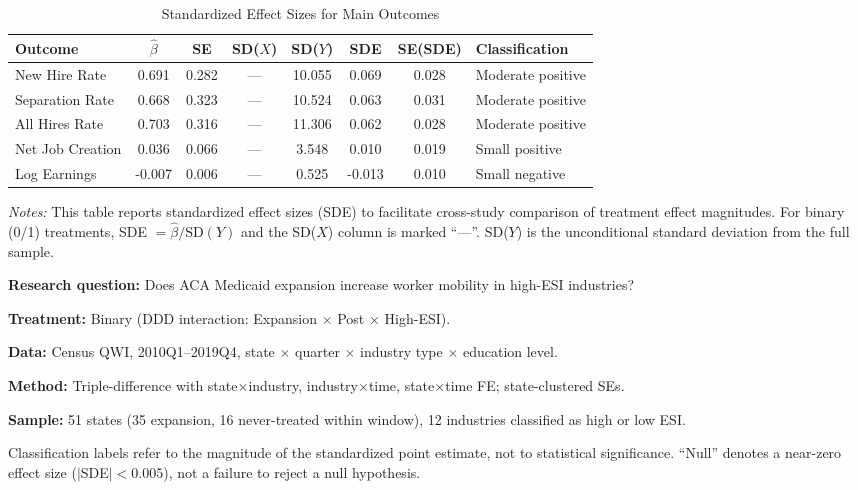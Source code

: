 \begin{table}[H]
\centering
\caption{Standardized Effect Sizes for Main Outcomes}
\label{tab:sde}
\begin{adjustbox}{max width=\textwidth}
\begin{tabular}{lccccccl}
\toprule
Outcome & $\hat{\beta}$ & SE & SD($X$) & SD($Y$) & SDE & SE(SDE) & Classification \\
\midrule
New Hire Rate & 0.691 & 0.282 & --- & 10.055 & 0.069 & 0.028 & Moderate positive \\
Separation Rate & 0.668 & 0.323 & --- & 10.524 & 0.063 & 0.031 & Moderate positive \\
All Hires Rate & 0.703 & 0.316 & --- & 11.306 & 0.062 & 0.028 & Moderate positive \\
Net Job Creation & 0.036 & 0.066 & --- & 3.548 & 0.010 & 0.019 & Small positive \\
Log Earnings & -0.007 & 0.006 & --- & 0.525 & -0.013 & 0.010 & Small negative \\
\bottomrule
\end{tabular}
\end{adjustbox}
\par\vspace{0.3em}
{\footnotesize \emph{Notes:} This table reports standardized effect sizes (SDE) to facilitate cross-study comparison of treatment effect magnitudes. For binary (0/1) treatments, SDE $= \hat{\beta} / \text{SD}(Y)$ and the SD($X$) column is marked ``---''. SD($Y$) is the unconditional standard deviation from the full sample.

\textbf{Research question:} Does ACA Medicaid expansion increase worker mobility in high-ESI industries?

\textbf{Treatment:} Binary (DDD interaction: Expansion $\times$ Post $\times$ High-ESI).

\textbf{Data:} Census QWI, 2010Q1--2019Q4, state $\times$ quarter $\times$ industry type $\times$ education level.

\textbf{Method:} Triple-difference with state$\times$industry, industry$\times$time, state$\times$time FE; state-clustered SEs.

\textbf{Sample:} 51 states (35 expansion, 16 never-treated within window), 12 industries classified as high or low ESI.

Classification labels refer to the magnitude of the standardized point estimate, not to statistical significance. ``Null'' denotes a near-zero effect size ($|$SDE$| < 0.005$), not a failure to reject a null hypothesis.}
\end{table}

